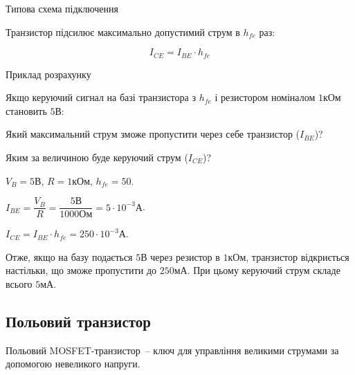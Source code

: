 \documentclass[12pt,a4paper]{book}  %
\begin{document}
Типова схема підключення

Транзистор підсилює максимально допустимий струм в $h_{fe}$ раз:

$$ I_{CE} = I_{BE} \cdot h_{fe} $$

Приклад розрахунку

Якщо керуючий сигнал на базі транзистора з $h_{fe}$ і резистором номіналом $1 \text{кОм}$ становить $5 \text{В}$:

Який максимальний струм зможе пропустити через себе транзистор ($I_{BE}$)?

Яким за величиною буде керуючий струм ($I_{CE}$)?

$V_B = 5\text{В}$,
$R = 1\text{кОм}$,
$h_{fe} = 50$.


$ I_{BE} = \dfrac{V_B}{R} = \dfrac{5\text{В}}{1000\text{Ом}} = 5 \cdot 10^{-3} \text{А} $.

$I_{CE} = I_{BE} \cdot h_{fe} = 250 \cdot 10^{-3} \text{А}$.

Отже, якщо на базу подається $5\text{В}$ через резистор в $1\text{кОм}$, транзистор відкриється настільки, що зможе пропустити до $250\text{мА}$. При цьому керуючий струм складе всього $5\text{мА}$.

\subsection{Польовий транзистор}

Польовий MOSFET-транзистор~-- ключ для управління великими струмами за допомогою невеликого напруги.

\begin{figure}[h!]
\label{ris:image}
\end{figure}

\end{document}
